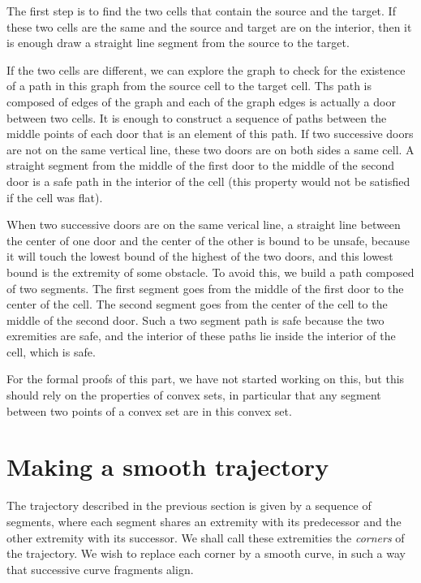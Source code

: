 \documentclass{easychair}
\begin{document}
The first step is to find the two cells that contain the source and
the target.  If these two cells are the same and the source and target
are on the interior, then it is enough draw a straight line segment from the
source to the target.

If the two cells are different, we can explore the graph to check for
the existence of a path in this graph from the source cell to the
target cell.  Ths path is composed of edges of the graph and each of
the graph edges is actually a door between two cells.  It is enough to
construct a sequence of paths between the middle points of each door
that is an element of this path.  If two successive doors are not on the same
vertical line, these two doors are on both sides a same cell.  A
straight segment from the middle of the first door to the middle of
the second door is a safe path in the interior of the cell (this
property would not be satisfied if the cell was flat).

When two successive doors are on the same verical line, a straight
line between the center of one door and the center of the other is
bound to be unsafe, because it will touch the lowest bound of the
highest of the two doors, and this lowest bound is the extremity of
some obstacle.  To avoid this, we build a path composed of two
segments.  The first segment goes from the middle of the first door to
the center of the cell.  The second segment goes from the center of
the cell to the middle of the second door.  Such a two segment path is
safe because the two exremities are safe, and the interior of these
paths lie inside the interior of the cell, which is safe.

For the formal proofs of this part, we have not started working on
this, but this should rely on the properties of convex sets, in
particular that any segment between two points of a convex set are in
this convex set.

\section{Making a smooth trajectory}
The trajectory described in the previous section is given by a
sequence of segments, where each segment shares an extremity with its
predecessor and the other extremity with its successor.  We shall call
these extremities the {\em corners} of the trajectory.  We wish to
replace each corner by a smooth curve, in such a way that successive
curve fragments align.
\end{document}
